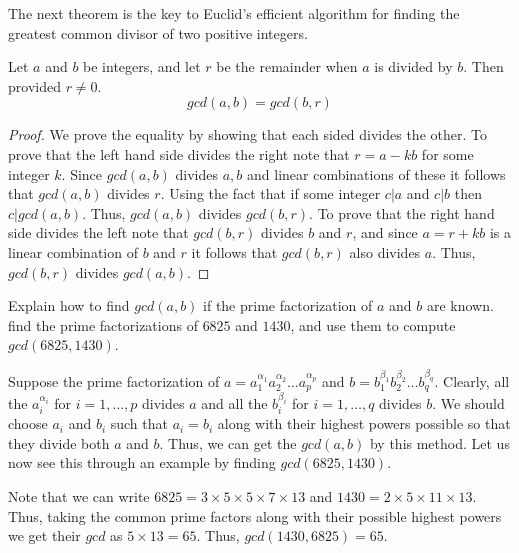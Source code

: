 The next theorem is the key to Euclid's efficient algorithm for finding the greatest common divisor of two positive integers.

\begin{theorem}
Let $a$ and $b$ be integers, and let $r$ be the remainder when $a$ is divided by $b$. Then provided $r\neq 0$.
\[
gcd(a,b)=gcd(b,r)
\]
\end{theorem}
\begin{proof}
    We prove the equality by showing that each sided divides the other. To prove that the left hand side divides the right note that $r=a-kb$ for some integer $k$. Since $gcd(a,b)$ divides $a,b$ and linear combinations of these it follows that $gcd(a,b)$ divides $r$. Using the fact that if some integer $c|a$ and $c|b$ then $c|gcd(a,b)$. Thus, $gcd(a,b)$ divides $gcd(b,r)$. To prove that the right hand side divides the left note that $gcd(b,r)$ divides $b$ and $r$, and since $a=r+kb$ is a linear combination of $b$ and $r$ it follows that $gcd(b,r)$ also divides $a$. Thus, $gcd(b,r)$ divides $gcd(a,b)$.
\end{proof}

\begin{example} 
Explain how to find $gcd(a,b)$ if the prime factorization of $a$ and $b$ are known. find the prime factorizations of $6825$ and $1430$, and use them to compute $gcd(6825,1430)$.

Suppose the prime factorization of $a = a_1^{\alpha_1}a_2^{\alpha_2} \ldots a_p^{\alpha_p}$ and $b=b_1^{\beta_1}b_2^{\beta_2} \ldots b_q^{\beta_q}$. Clearly, all the $a_i^{\alpha_i}$ for $i=1,\ldots,p$ divides $a$ and all the $b_i^{\beta_i}$ for $i=1,\ldots,q$ divides $b$. We should choose $a_i$ and $b_i$ such that $a_i=b_i$ along with their highest powers possible so that they divide both $a$ and $b$. Thus, we can get the $gcd(a,b)$ by this method. Let us now see this through  an example by finding $gcd(6825,1430)$.

Note that we can write $6825 = 3\times 5\times 5 \times 7 \times 13$ and $1430 = 2 \times 5 \times 11 \times 13$. Thus, taking the common prime factors along with their possible highest powers we get their $gcd$ as $5 \times 13 = 65$. Thus, $gcd(1430,6825)=65$.
\end{example}

